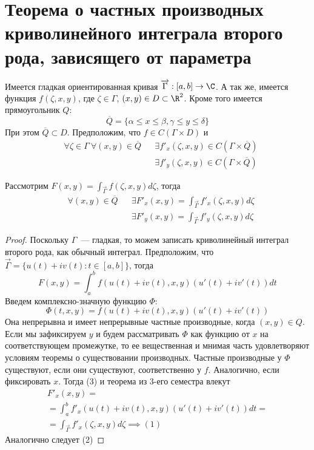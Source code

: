\documentclass[main]{subfiles}
\begin{document}
\section{Теорема о частных производных криволинейного интеграла второго рода, зависящего от параметра}
\begin{theorem}
    Имеется гладкая ориентированная кривая $\overrightarrow{\Gamma}: [a, b] \to \C$.
    А так же, имеется функция $f(\zeta, x,y)$, где $\zeta \in \Gamma$, $(x,y) \in D \subset \R^2$.
    Кроме того имеется прямоугольник $Q$:
    \[\overline{Q} = \{\alpha \le x \le \beta,  \gamma\le y \le \delta\}\]
    При этом $\overline{Q} \subset D$.
    Предположим, что $f \in C(\Gamma \times D)$ и
    \begin{align*}
         & \forall \zeta \in \Gamma\ \forall (x,y) \in \overline{Q} &  & \exists f'_x (\zeta, x,y) \in C(\Gamma \times \overline{Q}) \\
         &                                                          &  & \exists f'_y (\zeta, x,y) \in C(\Gamma \times \overline{Q})
    \end{align*}

    Рассмотрим $F (x,y) = \int_{\overrightarrow{\Gamma}} f(\zeta, x, y)d \zeta$, тогда
    \begin{align*}
         & \forall (x,y) \in \overline{Q} &  & \exists F'_x(x,y) = \int_{\overrightarrow{\Gamma}} f'_x (\zeta, x,y) d \zeta \tag{1} \\
         &                                &  & \exists F'_y(x,y) = \int_{\overrightarrow{\Gamma}} f'_y (\zeta, x,y) d \zeta \tag{2}
    \end{align*}
\end{theorem}
\begin{proof}
    Поскольку $\Gamma$~--- гладкая, то можем записать криволинейный интеграл второго рода, как обычный интеграл.
    Предположим, что $\overrightarrow{\Gamma} = \{u(t) + i v(t): t\in [a,b]\}$, тогда
    \[F(x,y) = \int_{a}^{b} f(u(t) + i v(t),x,y)(u'(t) + i v'(t))dt \tag{3} \]
    Введем комплексно-значную функцию $\Phi$:
    \[\Phi (t, x, y) = f(u(t) + i v(t),x,y)(u'(t) + i v'(t))\]
    Она непрерывна и имеет непрерывные частные производные, когда $(x,y) \in Q$.
    Если мы зафиксируем $y$ и будем рассматривать $\Phi$ как функцию от $x$ на соответствующем промежутке, то ее вещественная и мнимая часть удовлетворяют условиям теоремы о существовании производных.
    Частные производные у $\Phi$ существуют, если они существуют, соответственно у $f$.
    Аналогично, если фиксировать $x$.
    Тогда (3) и теорема из 3-его семестра влекут
    \begin{multline*}
        F'_x (x,y) = \\
        = \int_{a}^{b} f'_x(u(t) + i v(t),x,y)(u'(t) + i v'(t)) dt = \\
        = \int_{\overrightarrow{\Gamma}} f'_x(\zeta, x, y) d\zeta \implies (1)
    \end{multline*}
    Аналогично следует (2)
\end{proof}
\end{document}
